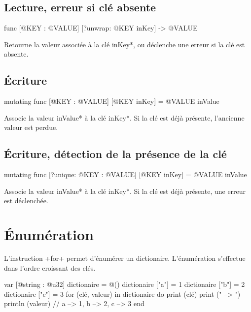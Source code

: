 \subsection{Lecture, erreur si clé absente}

\begin{galgas4box}
func [@KEY : @VALUE] [?unwrap: @KEY inKey] -> @VALUE
\end{galgas4box}

Retourne la valeur associée à la clé \ggsq*inKey*, ou déclenche une erreur si la clé est absente.




\subsection{Écriture}

\begin{galgas4box}
mutating func [@KEY : @VALUE] [@KEY inKey] = @VALUE inValue
\end{galgas4box}

Associe la valeur \ggsq*inValue* à la clé \ggsq*inKey*. Si la clé est déjà présente, l'ancienne valeur est perdue.






\subsection{Écriture, détection de la présence de la clé}

\begin{galgas4box}
mutating func [?unique: @KEY : @VALUE] [@KEY inKey] = @VALUE inValue
\end{galgas4box}

Associe la valeur \ggsq*inValue* à la clé \ggsq*inKey*. Si la clé est déjà présente, une erreur est déclenchée.






\section{Énumération}

L'instruction \ggsq+for+ permet d'énumérer un dictionaire. L'énumération s'effectue dans l'ordre croissant des clés.


\begin{galgas4}
var [@string : @u32] dictionaire = @()
dictionaire ["a"] = 1
dictionaire ["b"] = 2
dictionaire ["c"] = 3
for (clé, valeur) in dictionaire do
  print (clé)
  print (" --> ")
  println (valeur) // a --> 1, b --> 2, c --> 3
end
\end{galgas4}


